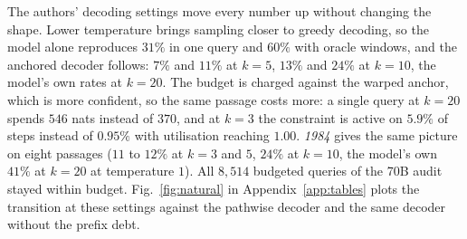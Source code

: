 The authors' decoding settings move every number up without changing the shape. Lower temperature brings sampling closer to greedy decoding, so the model alone reproduces $31\%$ in one query and $60\%$ with oracle windows, and the anchored decoder follows: $7\%$ and $11\%$ at $k=5$, $13\%$ and $24\%$ at $k=10$, the model's own rates at $k=20$. The budget is charged against the warped anchor, which is more confident, so the same passage costs more: a single query at $k=20$ spends $546$ nats instead of $370$, and at $k=3$ the constraint is active on $5.9\%$ of steps instead of $0.95\%$ with utilisation reaching $1.00$. \emph{1984} gives the same picture on eight passages ($11$ to $12\%$ at $k=3$ and $5$, $24\%$ at $k=10$, the model's own $41\%$ at $k=20$ at temperature $1$). All $8{,}514$ budgeted queries of the 70B audit stayed within budget. Fig.~\ref{fig:natural} in Appendix~\ref{app:tables} plots the transition at these settings against the pathwise decoder and the same decoder without the prefix debt.



